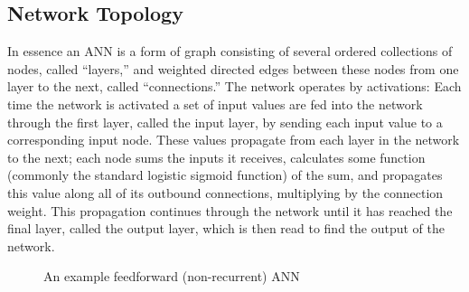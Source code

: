 \documentclass[ author={Stephen Livermore-Tozer},
				supervisor={Dr. Peter Flach},
				degree={MEng},
				title={Algorithmic Co-composition Using Machine Learning},
				subtitle={},
				type={research},
				year={2016} ]{dissertation}
\begin{document}
	\subsection{Network Topology}
	
	In essence an ANN is a form of graph consisting of several ordered collections of nodes, called ``layers,'' and weighted directed edges between these nodes from one layer to the next, called ``connections.'' The network operates by activations: Each time the network is activated a set of input values are fed into the network through the first layer, called the input layer, by sending each input value to a corresponding input node. These values propagate from each layer in the network to the next; each node sums the inputs it receives, calculates some function (commonly the standard logistic sigmoid function) of the sum, and propagates this value along all of its outbound connections, multiplying by the connection weight. This propagation continues through the network until it has reached the final layer, called the output layer, which is then read to find the output of the network.
	
	\begin{figure}[!ht]
		\centering
		\caption{An example feedforward (non-recurrent) ANN}
	\end{figure}
	
\end{document}
